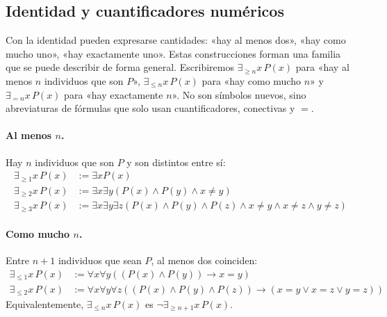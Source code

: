 
\subsection{Identidad y cuantificadores numéricos\ampliacion}\label{sec:cuantificadores-numericos}

Con la identidad pueden expresarse cantidades: «hay al menos dos», «hay como mucho uno», «hay exactamente uno». Estas construcciones forman una familia que se puede describir de forma general. Escribiremos $\exists_{\geq n} x\, P(x)$ para «hay al menos $n$ individuos que son $P$», $\exists_{\leq n} x\, P(x)$ para «hay como mucho $n$» y $\exists_{= n} x\, P(x)$ para «hay exactamente $n$». No son símbolos nuevos, sino abreviaturas de fórmulas que solo usan cuantificadores, conectivas y $=$.

\paragraph{Al menos $n$.} Hay $n$ individuos que son $P$ y son distintos entre sí:
\begin{align*}
\exists_{\geq 1} x\, P(x) &:= \exists x P(x)\\
\exists_{\geq 2} x\, P(x) &:= \exists x \exists y (P(x) \land P(y) \land x \neq y)\\
\exists_{\geq 3} x\, P(x) &:= \exists x \exists y \exists z (P(x) \land P(y) \land P(z) \land x \neq y \land x \neq z \land y \neq z)
\end{align*}

\paragraph{Como mucho $n$.} Entre $n + 1$ individuos que sean $P$, al menos dos coinciden:
\begin{align*}
\exists_{\leq 1} x\, P(x) &:= \forall x \forall y ((P(x) \land P(y)) \to x = y)\\
\exists_{\leq 2} x\, P(x) &:= \forall x \forall y \forall z ((P(x) \land P(y) \land P(z)) \to (x = y \lor x = z \lor y = z))
\end{align*}
Equivalentemente, $\exists_{\leq n} x\, P(x)$ es $\neg \exists_{\geq n+1} x\, P(x)$.

